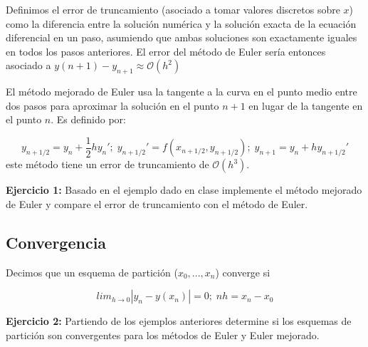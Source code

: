 \documentclass[10.5pt]{article}
\begin{document}
Definimos el error de truncamiento (asociado a tomar valores discretos sobre $x$) como la diferencia entre la solución numérica y la solución exacta de la ecuación diferencial en un paso, asumiendo que ambas soluciones son exactamente iguales en todos los pasos anteriores. El error del método de Euler sería entonces asociado a $y(n+1)-y_{n+1}\approx \mathcal{O}(h^{2})$

El método mejorado de Euler usa la tangente a la curva en el punto medio entre dos pasos para aproximar la solución en el punto $n+1$ en lugar de la tangente en el punto $n$. Es definido por:

\begin{equation}
y_{n+1/2}=y_{n}+\frac{1}{2}hy_{n}';\; y_{n+1/2}'=f(x_{n+1/2},y_{n+1/2});\; y_{n+1}=y_{n}+hy_{n+1/2}'
\end{equation} este método tiene un error de truncamiento de $\mathcal{O}(h^{3})$. 

{\bf Ejercicio 1:} Basado en el ejemplo dado en clase implemente el método mejorado de Euler y compare el error de truncamiento con el método de Euler.

\subsection{Convergencia}

Decimos que un esquema de partición ($x_{0},...,x_{n}$) converge si

\begin{equation}
lim_{h\rightarrow 0}|y_{n}-y(x_{n})|=0;\; nh=x_{n}-x_{0}
\end{equation}

{\bf Ejercicio 2:} Partiendo de los ejemplos anteriores determine si los esquemas de partición son convergentes para los métodos de Euler y Euler mejorado.
\end{document}
